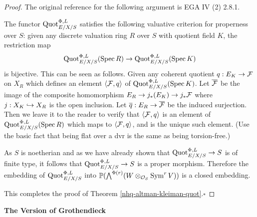 \begin{proof}
\medskip

The original reference for the following argument is EGA IV (2) 2.8.1.

The functor $\operatorname{Quot}_{E/X/S}^{\Phi,L}$ satisfies the following valuative
criterion for properness over $S$: given any discrete valuation ring
$R$ over $S$ with quotient field $K$, the restriction map
$$\operatorname{Quot}_{E/X/S}^{\Phi,L}(\operatorname{Spec} R) \to \operatorname{Quot}_{E/X/S}^{\Phi,L}(\operatorname{Spec} K)$$
is bijective. This can be seen as follows.
Given any coherent quotient
$q: E_K \to \mathcal{F}$ on $X_R$ which defines an element $\langle \mathcal{F}, q\rangle$
of $\operatorname{Quot}_{E/X/S}^{\Phi,L}(\operatorname{Spec} K)$.
Let $\overline{\mathcal{F}}$ be the image of the composite homomorphism
$E_R \to j_*(E_K) \to j_*\mathcal{F}$ where $j : X_K \hookrightarrow X_R$ is the open
inclusion. Let $\overline{q} : E_R\to \overline{\mathcal{F}}$ be the induced surjection.
Then we leave it to the reader to verify that \notready
$\langle \mathcal{F}, q\rangle$ is an element of $\operatorname{Quot}_{E/X/S}^{\Phi,L}(\operatorname{Spec} R)$
which maps to $\langle \mathcal{F}, q\rangle$, and is the unique such element.
(Use the basic fact that being flat over a dvr
is the same as being torsion-free.)

As $S$ is noetherian and as we have already shown that
$\operatorname{Quot}^{\Phi,L}_{E/X/S}\to S$ is of finite type,
it follows that $\operatorname{Quot}^{\Phi,L}_{E/X/S}\to S$ is a proper morphism.
Therefore the embedding of
$\operatorname{Quot}^{\Phi,L}_{E/X/S}$ into
$\mathbb{P}(\bigwedge ^{\Phi(r)} (W \otimes_{{\mathcal O}_S}\operatorname{Sym}^r V))$
is a closed embedding.

This completes the proof of Theorem \ref{nhq-altman-kleiman-quot}.\hfill$\square$\end{proof}





\bigskip


\centerline{\large\bf The Version of Grothendieck}


\medskip


